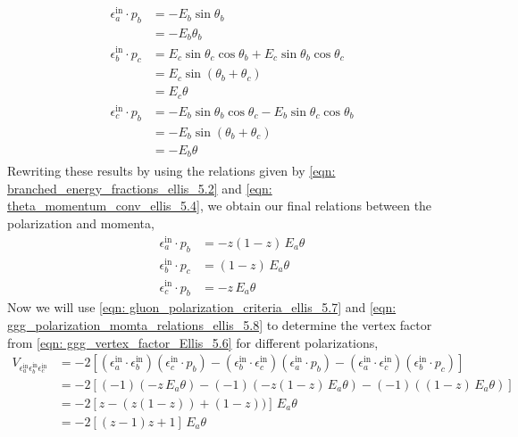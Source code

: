 \documentclass[main.tex]{subfiles}
\begin{document}
\begin{align}
    \begin{split}
    \epsilon^{\text{in}}_a \cdot p_b &= -E_b \sin \theta_b\\
        &= -E_b \theta_b \\
    \epsilon^{\text{in}}_b \cdot p_c &= E_c \sin \theta_c \cos \theta_b + E_c \sin \theta_b \cos \theta_c \\
    &= E_c \sin (\theta_b+\theta_c)  \\
    &= E_c \theta \\
    \epsilon^{\text{in}}_c \cdot p_b &= -E_b \sin \theta_b \cos \theta_c - E_b \sin \theta_c \cos \theta_b \\
    &= -E_b \sin(\theta_b+\theta_c) \\
    &= -E_b \theta
    \end{split}
\end{align}
Rewriting these results by using the relations given by \autoref{eqn: branched_energy_fractions_ellis_5.2} and \autoref{eqn: theta_momentum_conv_ellis_5.4}, we obtain our final relations between the polarization and momenta, 
\begin{align}\label{eqn: ggg_polarization_momta_relations_ellis_5.8}
    \epsilon^{\text{in}}_a \cdot p_b &= -z(1-z)\, E_a \theta \nonumber \\
    \epsilon^{\text{in}}_b \cdot p_c &= (1-z)\, E_a \theta\\
    \epsilon^{\text{in}}_c \cdot p_b &= -z\, E_a \theta \nonumber
\end{align}
Now we will use \autoref{eqn: gluon_polarization_criteria_ellis_5.7} and \autoref{eqn: ggg_polarization_momta_relations_ellis_5.8} to determine the vertex factor from \autoref{eqn: ggg_vertex_factor_Ellis_5.6} for different polarizations, 
\begin{align}
    V_{\epsilon_a^\text{in} \epsilon_b^\text{in} \epsilon_c^\text{in}} &= -2 \left[
    (\epsilon_a^\text{in} \cdot \epsilon_b^\text{in})(\epsilon_c^\text{in} \cdot p_b) - 
    (\epsilon_b^\text{in} \cdot \epsilon_c^\text{in})(\epsilon_a^\text{in} \cdot p_b) -
    (\epsilon_a^\text{in} \cdot \epsilon_c^\text{in})(\epsilon_b^\text{in} \cdot p_c)
    \right] \nonumber\\
    &= -2 \left[
    (-1)(-z\,E_a\theta) - (-1)(-z(1-z)\,E_a\theta) - (-1)((1-z)\, E_a\theta) 
    \right] \nonumber \\
    &= -2 \left[ z - (z(1-z)) + (1-z) ) \right] \,E_a\theta \nonumber \\
    &= -2 \left[ (z-1)z+ 1 \right] \,E_a\theta
\end{align}
\end{document}
